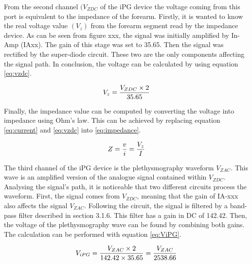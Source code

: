 
From the second channel $(V_{ZDC}$ of the iPG device the voltage coming from this port is equivalent to the impedance of the forearm. Firstly, it is wanted to know the real voltage value  $(V_z)$ from the forearm segment read by the impedance device. As can be seen from figure xxx, the signal was initially amplified by In-Amp (IAxx). The gain of this stage was set to 35.65. Then the signal was rectified by the super-diode circuit. These two are the only components affecting the signal path. In conclusion, the voltage can be calculated by using equation \ref{eq:vzdc}.


\begin{align}
	\label{eq:vzdc}
	V_z = \frac{V_{ZDC} \times 2}{35.65} \tagaddtext{[\si{\volt}]}
\end{align}

Finally, the impedance value can be computed by converting the voltage into impedance using Ohm's law. This can be achieved by replacing equation \ref{eq:current} and \ref{eq:vzdc} into \ref{eq:impedance}.

\begin{align}
	\label{eq:impedance}
	Z = \frac{v}{i}=\frac{V_z}{I} \tagaddtext{[\si{\ohm}]}
\end{align}

The third channel of the iPG device is the plethysmography waveform $V_{ZAC}$. This wave is an amplified version of the analogue signal contained within $V_{ZDC}$. Analysing the signal's path, it is noticeable that two different circuits process the waveform. First, the signal comes from $V_{ZDC}$, meaning that the gain of IA-xxx also affects the signal $V_{ZAC}$. Following the circuit, the signal is filtered by a band-pass filter described in section 3.1.6. This filter has a gain in DC of 142.42. Then, the voltage of the plethysmography wave can be found by combining both gains. The calculation can be performed with equation \ref{eq:ViPG}.

\begin{align}
	\label{eq:ViPG}
	V_{iPG} = \frac{V_{ZAC} \times 2}{142.42 \times 35.65}=\frac{V_{ZAC}}{2538.66} \tagaddtext{[\si{\volt}]}
\end{align}

